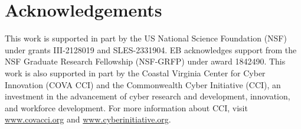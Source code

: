 \documentclass{article}
\begin{document}
\section*{Acknowledgements}
This work is supported in part by the US National Science Foundation (NSF) under grants III-2128019 and SLES-2331904.
EB acknowledges support from the NSF Graduate Research Fellowship (NSF-GRFP) under award 1842490.
This work is also supported in part by the Coastal Virginia Center for Cyber Innovation (COVA CCI)
and the Commonwealth Cyber Initiative (CCI), an investment in the advancement of cyber research and development, innovation, and workforce development. For more information about CCI, visit \url{www.covacci.org} and \url{www.cyberinitiative.org}.


\end{document}
